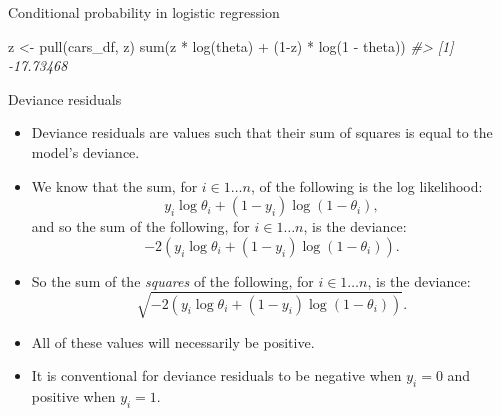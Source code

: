 \documentclass[
  10pt,
  ignorenonframetext,
]{beamer}
\newenvironment{Shaded}{\begin{snugshade}}{\end{snugshade}}
\newcommand{\AttributeTok}[1]{\textcolor[rgb]{0.77,0.63,0.00}{#1}}
\newcommand{\CommentTok}[1]{\textcolor[rgb]{0.56,0.35,0.01}{\textit{#1}}}
\newcommand{\DecValTok}[1]{\textcolor[rgb]{0.00,0.00,0.81}{#1}}
\newcommand{\FunctionTok}[1]{\textcolor[rgb]{0.00,0.00,0.00}{#1}}
\newcommand{\NormalTok}[1]{#1}
\newcommand{\OtherTok}[1]{\textcolor[rgb]{0.56,0.35,0.01}{#1}}
\newcommand{\SpecialCharTok}[1]{\textcolor[rgb]{0.00,0.00,0.00}{#1}}
\newcommand{\StringTok}[1]{\textcolor[rgb]{0.31,0.60,0.02}{#1}}
\providecommand{\tightlist}{%
  \setlength{\itemsep}{0pt}\setlength{\parskip}{0pt}}
\begin{document}
\begin{frame}[fragile]{Conditional probability in logistic regression}
\protect\hypertarget{conditional-probability-in-logistic-regression-2}{}
\begin{Shaded}
\end{Shaded}

\begin{Shaded}
\begin{Highlighting}[]
\NormalTok{z }\OtherTok{\textless{}{-}} \FunctionTok{pull}\NormalTok{(cars\_df, z)}
\FunctionTok{sum}\NormalTok{(z }\SpecialCharTok{*} \FunctionTok{log}\NormalTok{(theta) }\SpecialCharTok{+}\NormalTok{ (}\DecValTok{1}\SpecialCharTok{{-}}\NormalTok{z) }\SpecialCharTok{*} \FunctionTok{log}\NormalTok{(}\DecValTok{1} \SpecialCharTok{{-}}\NormalTok{ theta))}
\CommentTok{\#\textgreater{} [1] {-}17.73468}
\end{Highlighting}
\end{Shaded}
\end{frame}

\begin{frame}{Deviance residuals}
\protect\hypertarget{deviance-residuals}{}
\begin{itemize}
\tightlist
\item
  Deviance residuals are values such that their sum of squares is equal
  to the model's deviance.
\item
  We know that the sum, for \(i \in 1 \ldots n\), of the following is
  the log likelihood: \[
  y_i \log\theta_i + (1-y_i)\log(1-\theta_i),
  \] and so the sum of the following, for \(i \in 1 \ldots n\), is the
  deviance: \[
  -2 \left(y_i \log\theta_i + (1-y_i)\log(1-\theta_i)\right).
  \]
\item
  So the sum of the \emph{squares} of the following, for
  \(i \in 1 \ldots n\), is the deviance: \[
  \sqrt{-2 \left(y_i \log\theta_i + (1-y_i)\log(1-\theta_i)\right)}.
  \]
\item
  All of these values will necessarily be positive.
\item
  It is conventional for deviance residuals to be negative when
  \(y_i=0\) and positive when \(y_i = 1\).
\end{itemize}
\end{frame}
\end{document}
